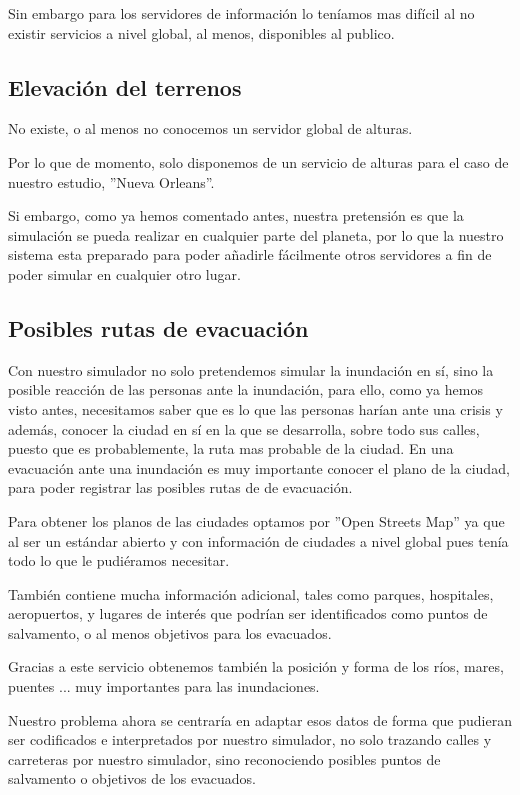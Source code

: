 Sin embargo para los servidores de información lo teníamos mas difícil al no
existir servicios a nivel global, al menos, disponibles al publico.

\subsection*{Elevación del terrenos}

No existe, o al menos no conocemos un servidor global de alturas.

Por lo que de momento, solo disponemos de un servicio de alturas para el caso de
nuestro estudio, ''Nueva Orleans''.

Si embargo, como ya hemos comentado antes, nuestra pretensión es que la
simulación se pueda realizar en cualquier parte del planeta, por lo que la
nuestro sistema esta preparado para poder añadirle fácilmente otros servidores a
fin de poder simular en cualquier otro lugar. 

\subsection*{Posibles rutas de evacuación}

Con nuestro simulador no solo pretendemos simular la inundación en sí, sino la
posible reacción de las personas ante la inundación, para ello, como ya hemos
visto antes, necesitamos saber que es lo que las personas harían ante una
crisis y además, conocer la ciudad en sí en la que se desarrolla, sobre todo sus
calles, puesto que es probablemente, la ruta mas probable de la ciudad.
En una evacuación ante una inundación es muy importante conocer el plano de la
ciudad, para poder registrar las posibles rutas de de evacuación.

Para obtener los planos de las ciudades optamos por ''Open Streets Map'' ya que
al ser un estándar abierto y con información de ciudades a nivel global pues
tenía todo lo que le pudiéramos necesitar. 

También contiene mucha información adicional, tales como parques, hospitales,
aeropuertos, y lugares de interés que podrían ser identificados como puntos de
salvamento, o al menos objetivos para los evacuados.

Gracias a este servicio obtenemos también la posición y forma de los ríos,
mares, puentes ... muy importantes para las inundaciones. 

Nuestro problema ahora se centraría en adaptar esos datos de forma que pudieran
ser codificados e interpretados por nuestro simulador, no solo trazando calles
y carreteras por nuestro simulador, sino reconociendo posibles puntos de
salvamento o objetivos de los evacuados.

